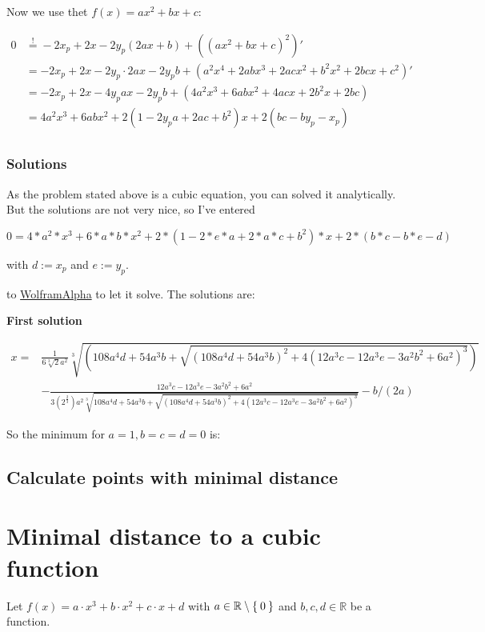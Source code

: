 \documentclass[a4paper]{scrartcl}
\def\mdr{\ensuremath{\mathbb{R}}}
\begin{document}
Now we use thet $f(x) = ax^2 + bx + c$:

\begin{align}
    0     &\stackrel{!}{=} -2 x_p + 2x -2y_p(2ax+b) + ((ax^2+bx+c)^2)'\\
          &= -2 x_p + 2x -2y_p \cdot 2ax-2 y_p b + (a^2 x^4+2 a b x^3+2 a c x^2+b^2 x^2+2 b c x+c^2)'\\
          &= -2 x_p + 2x -4y_p ax-2 y_p b + (4a^2 x^3 + 6 ab x^2 + 4acx + 2b^2 x + 2bc)\\
          &= 4a^2 x^3 + 6 ab x^2 + 2(1 -2y_p a+ 2ac + b^2)x +2(bc-by_p-x_p)\\
\end{align}

\subsubsection{Solutions}
As the problem stated above is a cubic equation, you can solved it
analytically. But the solutions are not very nice, so I've entered

\texttt{$0=4*a^2 *x^3 + 6 *a*b *x^2 + 2*(1 -2*e *a+ 2*a*c + b^2)*x +2*(b*c-b*e-d)$}

with $d := x_p$ and $e := y_p$.

to \href{http://www.wolframalpha.com/input/?i=0%3D4*a%5E2+*x%5E3+%2B+6+*a*b+*x%5E2+%2B+2*%281+-2*e+*a%2B+2*a*c+%2B+b%5E2%29*x+%2B2*%28b*c-b*e-d%29}{WolframAlpha} to let it solve. The solutions are:

\textbf{First solution}

\begin{align*}
    x = &\frac{1}{6 \sqrt[3]{2} a^2} \sqrt[3]{(108 a^4 d+54 a^3 b+\sqrt{(108 a^4 d+54 a^3 b)^2+4 (12 a^3 c-12 a^3 e-3 a^2 b^2+6 a^2)^3})}\\
        &-\frac{12 a^3 c-12 a^3 e-3 a^2 b^2+6 a^2}
         {3 (2^{\frac{2}{3}}) a^2 \sqrt[3]{108 a^4 d+54 a^3 b+\sqrt{(108 a^4 d+54 a^3 b)^2+4 (12 a^3 c-12 a^3 e-3 a^2 b^2+6 a^2)^3}} }-b/(2 a)
\end{align*}

So the minimum for $a=1, b=c=d=0$ is:


\subsection{Calculate points with minimal distance}

\section{Minimal distance to a cubic function}
Let $f(x) = a \cdot x^3 + b \cdot x^2 + c \cdot x + d$ with $a \in \mdr \setminus \Set{0}$ and 
$b, c, d \in \mdr$ be a function.
\end{document}
